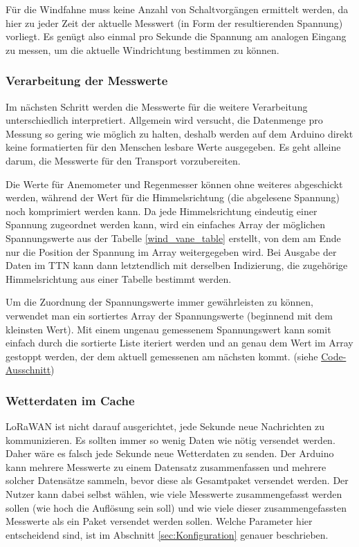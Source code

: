 \documentclass[12pt]{article}
\begin{document}
      Für die Windfahne muss keine Anzahl von Schaltvorgängen ermittelt werden, da hier zu jeder Zeit der aktuelle Messwert (in Form der resultierenden Spannung) vorliegt.
      Es genügt also einmal pro Sekunde die Spannung am analogen Eingang zu messen, um die aktuelle Windrichtung bestimmen zu können.



      \subsubsection{Verarbeitung der Messwerte} \label{processing_records}
      Im nächsten Schritt werden die Messwerte für die weitere Verarbeitung unterschiedlich interpretiert.
      Allgemein wird versucht, die Datenmenge pro Messung so gering wie möglich zu halten, deshalb werden auf dem Arduino direkt keine formatierten für den Menschen lesbare Werte ausgegeben.
      Es geht alleine darum, die Messwerte für den Transport vorzubereiten.

      Die Werte für Anemometer und Regenmesser können ohne weiteres abgeschickt werden, während der Wert für die Himmelsrichtung (die abgelesene Spannung) noch komprimiert werden kann.
      Da jede Himmelsrichtung eindeutig einer Spannung zugeordnet werden kann, wird ein einfaches Array der möglichen Spannungswerte aus der Tabelle \underline{\ref{wind_vane_table}} erstellt, von dem am Ende nur die Position der Spannung im Array weitergegeben wird.
      Bei Ausgabe der Daten im TTN kann dann letztendlich mit derselben Indizierung, die zugehörige Himmelsrichtung aus einer Tabelle bestimmt werden.

      Um die Zuordnung der Spannungswerte immer gewährleisten zu können, verwendet man ein sortiertes Array der Spannungswerte (beginnend mit dem kleinsten Wert).
      Mit einem ungenau gemessenem Spannungswert kann somit einfach durch die sortierte Liste iteriert werden und an genau dem Wert im Array gestoppt werden, der dem aktuell gemessenen am nächsten kommt.
      (siehe \href{https://github.com/HTWDD-RN/ps21-LoRa/blob/9c012bc1d41e960b6edf9e756e8948e387f28c83/src/lora_weather_station/lora_weather_station.ino#L87}{Code-Ausschnitt})
      


      \subsubsection{Wetterdaten im Cache} \label{cache}
      LoRaWAN ist nicht darauf ausgerichtet, jede Sekunde neue Nachrichten zu kommunizieren.
      Es sollten immer so wenig Daten wie nötig versendet werden.
      Daher wäre es falsch jede Sekunde neue Wetterdaten zu senden.
      Der Arduino kann mehrere Messwerte zu einem Datensatz zusammenfassen und mehrere solcher Datensätze sammeln, bevor diese als Gesamtpaket versendet werden.
      Der Nutzer kann dabei selbst wählen, wie viele Messwerte zusammengefasst werden sollen (wie hoch die Auflösung sein soll) und wie viele dieser zusammengefassten Messwerte als ein Paket versendet werden sollen.
      Welche Parameter hier entscheidend sind, ist im Abschnitt \underline{\ref{sec:Konfiguration}} genauer beschrieben.
\end{document}
